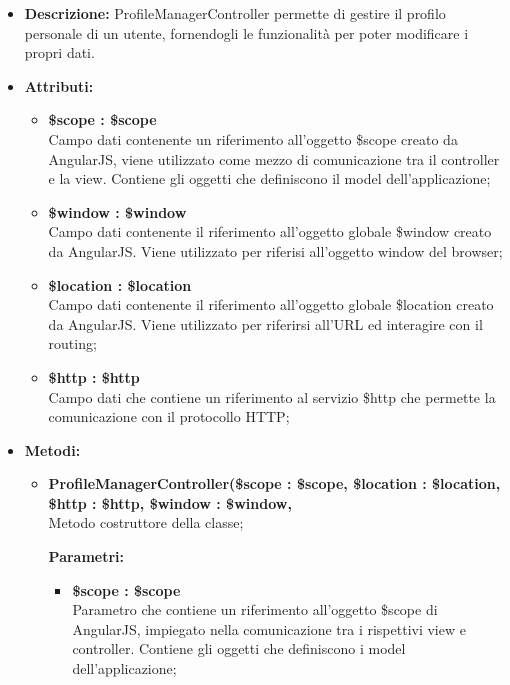 \begin{itemize}
	\item \textbf{Descrizione:} ProfileManagerController permette di gestire il profilo personale di un
	utente, fornendogli le funzionalità per poter modificare i propri dati.
	\item \textbf{Attributi:}
	\begin{itemize}
		
		\item \textbf{\$scope : \$scope}\\
		Campo dati contenente un riferimento all'oggetto \$scope creato da AngularJS, viene utilizzato come mezzo di comunicazione tra il controller e la view. Contiene gli oggetti che definiscono il model dell'applicazione;
		
		\item \textbf{\$window : \$window}\\
		Campo dati contenente il riferimento all'oggetto globale \$window creato da AngularJS. Viene utilizzato per riferisi all'oggetto window del browser;
		
		\item \textbf{\$location : \$location }\\
		Campo dati contenente il riferimento all'oggetto globale \$location creato da AngularJS. Viene utilizzato per riferirsi all'URL ed interagire con il routing;
		
		\item \textbf{\$http : \$http }\\
		Campo dati che contiene un riferimento al servizio \$http che permette la comunicazione con il protocollo HTTP;
		
		
	\end{itemize}
	\item \textbf{Metodi:}
	\begin{itemize}
		
		\item \textbf{ProfileManagerController(\$scope : \$scope, \$location : \$location, \$http : \$http, \$window : \$window,}\\
		Metodo costruttore della classe;
		\begin{description}
			\item[\textbf{Parametri:}]
		\end{description}
		\begin{itemize}
			\item \textbf{\$scope : \$scope}\\
			Parametro che contiene un riferimento all'oggetto \$scope di AngularJS, impiegato nella comunicazione tra i rispettivi view e controller. Contiene gli oggetti che definiscono i model dell'applicazione;
			

\end{itemize}
\end{itemize}
\end{itemize}
